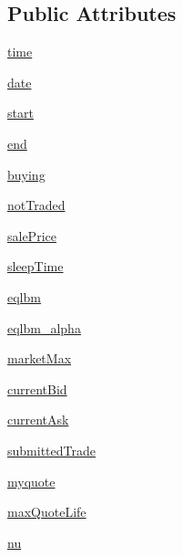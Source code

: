 \subsection*{Public Attributes}
\begin{DoxyCompactItemize}
\item 
\hyperlink{classexecutioner_1_1_executioner_ae8db6792c5c76a40637c27fe10522a24}{time}
\item 
\hyperlink{classexecutioner_1_1_executioner_a03dd7482b84096a487fdb57bc0043416}{date}
\item 
\hyperlink{classexecutioner_1_1_executioner_ab2ede15d6046914ceb0bdc125875a6c4}{start}
\item 
\hyperlink{classexecutioner_1_1_executioner_a061459729481b9092f68a739b03a9f1d}{end}
\item 
\hyperlink{classexecutioner_1_1_executioner_a7f5573bf3ae0b92299489fb2bb2dd15d}{buying}
\item 
\hyperlink{classexecutioner_1_1_executioner_a3f81fa1f38ae1873aece95ac60c11c4e}{not\-Traded}
\item 
\hyperlink{classexecutioner_1_1_executioner_aacf208e692fbffe2144020532b3ef385}{sale\-Price}
\item 
\hyperlink{classexecutioner_1_1_executioner_a29f6130ae1cbc5bffd8f77faa3846bcd}{sleep\-Time}
\item 
\hyperlink{classexecutioner_1_1_executioner_a5c15de3aad9926aa92482b783fd0bfcf}{eqlbm}
\item 
\hyperlink{classexecutioner_1_1_executioner_aff48d8103fb0e74e7df2fe780c064d27}{eqlbm\-\_\-alpha}
\item 
\hyperlink{classexecutioner_1_1_executioner_a018e98c1eec00c34ee15ee218a0a2825}{market\-Max}
\item 
\hyperlink{classexecutioner_1_1_executioner_a4426ec5e2dcb1e2b48ec0235747dd85e}{current\-Bid}
\item 
\hyperlink{classexecutioner_1_1_executioner_a349d2f4c5fbf0b05976578f087485190}{current\-Ask}
\item 
\hyperlink{classexecutioner_1_1_executioner_a0bb4a6c37b9cb800bc8be3661d2878a9}{submitted\-Trade}
\item 
\hyperlink{classexecutioner_1_1_executioner_a257a0a9928de321a1b2561ca70aff78d}{myquote}
\item 
\hyperlink{classexecutioner_1_1_executioner_a60e3446cc9c7e095f72d323330851c8a}{max\-Quote\-Life}
\item 
\hyperlink{classexecutioner_1_1_executioner_a71d5b0430d37b3f8bdba3d42fad41035}{nu}
\item 

\end{DoxyCompactItemize}
